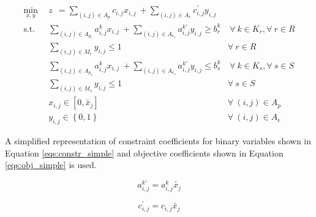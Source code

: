 \begin{subequations}\label{eqs:NFCTP}
  \begin{align}
    \min_{x, y} \:\: 
    & 
    z \:\: = 
    \sum_{(i, j) \in A_p} c_{i,j} x_{i,j} 
    \: + 
    \sum_{(i, j) \in A_e} c^{\prime}_{i,j} y_{i,j} 
    & 
    \label{eqs:NFCTP_obj} \\
    \text{s.t.} \:\:
    &
    \sum_{(i, j) \in A_{p_r}} a^k_{i,j} x_{i,j}
    \: + 
    \sum_{(i, j) \in A_{e_r}} a^{k\prime}_{i,j} y_{i,j}
    \geq b^k_r 
    &
    \: 
    \forall \: k \in K_r,  
    \forall \: r \in R 
    \label{eqs:NFCTP_req} \\
    &
    \sum_{(i, j) \in M_{r}} y_{i,j} \leq 1 
    &
    \forall \: r \in R 
    \label{eqs:NFCTP_mut_req} \\
    &
    \sum_{(i, j) \in A_{p_s}} a^k_{i,j} x_{i,j}
    \: + 
    \sum_{(i, j) \in A_{e_s}} a^{k\prime}_{i,j} y_{i,j}
    \leq b^k_s 
    &
    \: 
    \forall \: k \in K_s, 
    \forall \: s \in S 
    \label{eqs:NFCTP_sup} \\
    &
    \sum_{(i, j) \in M_{s}} y_{i,j} \leq 1 
    &
    \forall \: s \in S 
    \label{eqs:NFCTP_mut_sup} \\
    &
    x_{i,j} \in [0, \tilde{x_j}]
    &
    \forall \: (i, j) \in A_p
    \label{eqs:NFCTP_x} \\
    &
    y_{i,j} \in \left\{ 0, 1 \right\}
    &
    \forall \: (i, j) \in A_e
    \label{eqs:NFCTP_y}
  \end{align}
\end{subequations}

\noindent
A simplified representation of constraint coefficients for binary variables
shown in Equation \ref{eqs:constr_simple} and objective coefficients shown in
Equation \ref{eqs:obj_simple} is used.

\begin{equation}\label{eqs:constr_simple}
a^{k\prime}_{i,j} = a^k_{i,j} \tilde{x_j}
\end{equation}

\begin{equation}\label{eqs:obj_simple}
c^{\prime}_{i,j} = c_{i,j} \tilde{x_j}
\end{equation}

